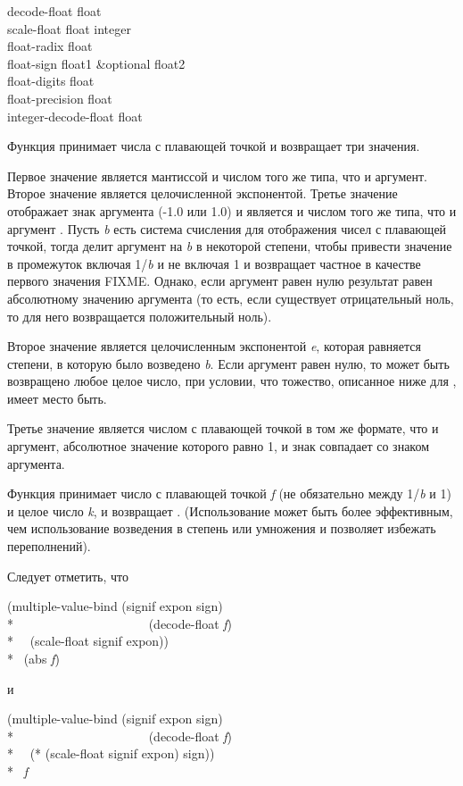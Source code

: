 \begin{defun}[Функция]
decode-float float \\
scale-float float integer \\
float-radix float \\
float-sign float1 &optional float2 \\
float-digits float \\
float-precision float \\
integer-decode-float float

Функция  принимает числа с плавающей точкой и возвращает три
значения.

Первое значение является мантиссой и числом того же типа, что и
аргумент. Второе значение является целочисленной экспонентой.
Третье значение отображает знак аргумента (-1.0 или 1.0) и является и числом
того же типа, что и аргумент .
Пусть \emph{b} есть система счисления для отображения чисел с плавающей точкой,
тогда  делит аргумент на \emph{b} в некоторой степени, чтобы
привести значение в промежуток включая 1/\emph{b} и не включая 1 и возвращает
частное в качестве первого значения FIXME. Однако, если аргумент равен нулю
результат равен абсолютному значению аргумента (то есть, если существует
отрицательный ноль, то для него возвращается положительный ноль).

Второе значение  является целочисленным экспонентой \emph{e},
которая равняется степени, в которую было возведено \emph{b}.
Если аргумент равен нулю, то может быть возвращено любое целое число, при
условии, что тожество, описанное ниже для , имеет место быть.

Третье значение  является числом с плавающей точкой в том же
формате, что и аргумент, абсолютное значение которого равно 1, и знак совпадает
со знаком аргумента.

Функция  принимает число с плавающей точкой \emph{f} (не
обязательно между 1/\emph{b} и 1) и целое число \emph{k}, и возвращает .
(Использование  может быть более эффективным, чем использование
возведения в степень или умножения и позволяет избежать переполнений).

Следует отметить, что
\begin{lisp}
(multiple-value-bind (signif expon sign) \\*
~~~~~~~~~~~~~~~~~~~~~(decode-float \emph{f}) \\*
~~(scale-float signif expon)) \\*
\EQ\ (abs \emph{f})
\end{lisp}
и
\begin{lisp}
(multiple-value-bind (signif expon sign) \\*
~~~~~~~~~~~~~~~~~~~~~(decode-float \emph{f}) \\*
~~(* (scale-float signif expon) sign)) \\*
\EQ\ \emph{f}
\end{lisp}


\end{defun}
